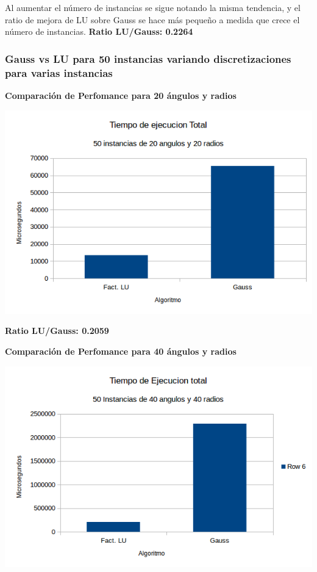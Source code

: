 Al aumentar el n\'umero de instancias se sigue notando la misma tendencia, y el ratio de mejora de LU sobre Gauss se hace m\'as pequeño a medida que crece el n\'umero de instancias. \textbf{Ratio LU/Gauss: 0.2264}

\subsubsection{Gauss vs LU para 50 instancias variando discretizaciones para varias instancias}

  	\textbf{Comparaci\'on de Perfomance para 20 \'angulos y radios }\\
\begin{center}
\includegraphics[scale=0.7]{experimentos2a_2b/2b2020.png}
\end{center}

 \textbf{Ratio LU/Gauss: 0.2059}

  	\textbf{Comparaci\'on de Perfomance para 40 \'angulos y radios }\\
\begin{center}
\includegraphics[scale=0.7]{experimentos2a_2b/2b4040.png}
\end{center}

